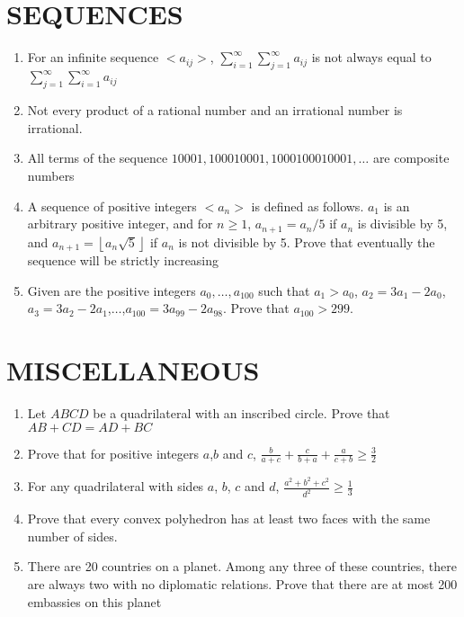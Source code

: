 \documentclass[12pt]{article}
\newcommand{\floor}[1]{\left\lfloor #1 \right\rfloor}
\begin{document}
\section{SEQUENCES}
\begin{enumerate}
    \item For an infinite sequence $<a_{ij}>$, $\displaystyle\sum_{i=1}^{\infty}\sum_{j=1}^{\infty} a_{ij}$ is not always equal to $\displaystyle\sum_{j=1}^{\infty}\sum_{i=1}^{\infty} a_{ij}$
    \item Not every product of a rational number and an irrational number is irrational.
    \item All terms of the sequence $10001, 100010001, 1000100010001,\dots$ are composite numbers
    \item A sequence of positive integers $<a_{n}>$ is defined as follows. $a_{1}$ is an arbitrary positive integer, and for $n \ge 1$, $a_{n+1}=a_{n}/5$ if $a_{n}$ is divisible by 5, and $a_{n+1} = \floor{a_{n}\sqrt{5}}$ if $a_{n}$ is not divisible by 5. Prove that eventually the sequence will be strictly increasing
    \item Given are the positive integers $a_{0},\dots,a_{100}$ such that $a_{1} > a_{0}$, $a_{2} = 3a_{1} - 2a_{0}$, $a_{3} = 3a_{2} - 2a_{1}$,$\dots$,$a_{100} = 3a_{99} - 2a_{98}$. Prove that $a_{100} > 299$.

\end{enumerate}

\section{MISCELLANEOUS}
\begin{enumerate}
    \item Let $ABCD$ be a quadrilateral with an inscribed circle. Prove that $AB+CD=AD+BC$
    \item Prove that for positive integers $a$,$b$ and $c$, $\frac{b}{a+c} + \frac{c}{b+a} + \frac{a}{c+b} \geq \frac{3}{2}$
    \item For any quadrilateral with sides $a$, $b$, $c$ and $d$, $\frac{a^{2}+b^{2}+c^{2}}{d^{2}} \geq \frac{1}{3}$
    \item Prove that every convex polyhedron has at least two faces with the same number of sides.
    \item There are 20 countries on a planet. Among any three of these countries, there are always two with no diplomatic relations. Prove that there are at most 200 embassies on this planet

\end{enumerate}
\pagebreak
\end{document}
